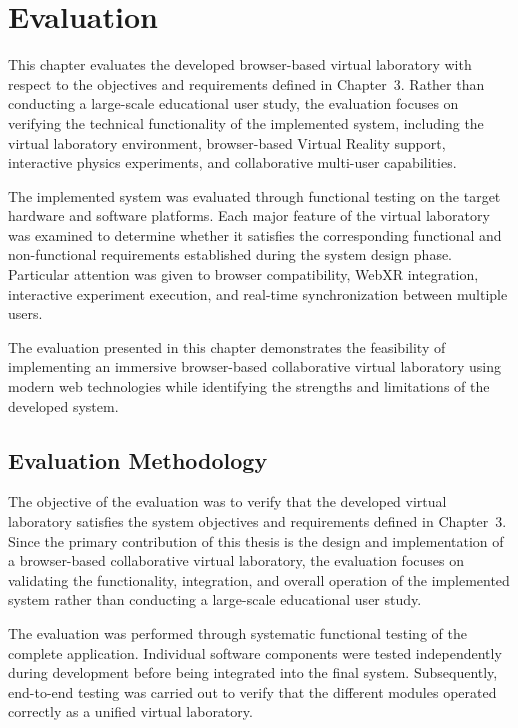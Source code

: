 \chapter{Evaluation}

This chapter evaluates the developed browser-based virtual laboratory with respect to the objectives and requirements defined in Chapter~3. Rather than conducting a large-scale educational user study, the evaluation focuses on verifying the technical functionality of the implemented system, including the virtual laboratory environment, browser-based Virtual Reality support, interactive physics experiments, and collaborative multi-user capabilities.

The implemented system was evaluated through functional testing on the target hardware and software platforms. Each major feature of the virtual laboratory was examined to determine whether it satisfies the corresponding functional and non-functional requirements established during the system design phase. Particular attention was given to browser compatibility, WebXR integration, interactive experiment execution, and real-time synchronization between multiple users.

The evaluation presented in this chapter demonstrates the feasibility of implementing an immersive browser-based collaborative virtual laboratory using modern web technologies while identifying the strengths and limitations of the developed system.

\section{Evaluation Methodology}

The objective of the evaluation was to verify that the developed virtual laboratory satisfies the system objectives and requirements defined in Chapter~3. Since the primary contribution of this thesis is the design and implementation of a browser-based collaborative virtual laboratory, the evaluation focuses on validating the functionality, integration, and overall operation of the implemented system rather than conducting a large-scale educational user study.

The evaluation was performed through systematic functional testing of the complete application. Individual software components were tested independently during development before being integrated into the final system. Subsequently, end-to-end testing was carried out to verify that the different modules operated correctly as a unified virtual laboratory.

